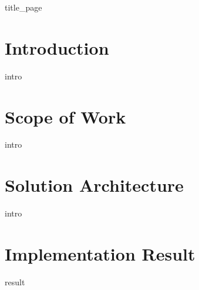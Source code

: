 \documentclass[a4paper, 12pt]{article}
\begin{document}
{title_page}

\newpage
\tableofcontents
\newpage

\section{Introduction}
{intro}

\section{Scope of Work}
{intro}

\section{Solution Architecture}
{intro}

\section{Implementation Result}
{result}


\newpage
\printbibliography

\printindex
\end{document}
